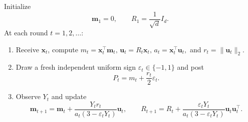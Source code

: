 \documentclass[11pt]{article}
\newcommand{\norm}[1]{\lVert #1\rVert_2}
\newcommand{\bm}{\boldsymbol m}
\newcommand{\bx}{\boldsymbol x}
\begin{document}
\begin{algorithm}[H]
\caption{Adversarial Contextual Search}\label{alg:adversarial}
\vspace{3pt}
Initialize
\begin{equation}\label{eq:init}
 \bm_1=0,\qquad R_1=\frac1{\sqrt d}I_d.
\end{equation}
At each round $t=1,2,\ldots$:
\begin{enumerate}
 \item Receive $\bx_t$, compute
 \(
 m_t=\bx_t^\top\bm_t,\,
 \boldsymbol u_t=R_t\bx_t,\,
 a_t=\bx_t^\top\boldsymbol u_t,\) and \(
 r_t=\norm{\boldsymbol u_t}.
 \)
 \item Draw a fresh independent uniform {sign }$\varepsilon_t\in\{-1,1\}$ and post
 \begin{equation}\label{eq:price}
 P_t=m_t+\frac{r_t}{2}\varepsilon_t.
 \end{equation}
 \item Observe $Y_t$ and update
 \begin{equation}\label{eq:update}
 \bm_{t+1}=\bm_t+\frac{Y_t r_t}{a_t(3-\varepsilon_t Y_t)}\boldsymbol u_t,
 \qquad
 R_{t+1}=R_t+\frac{\varepsilon_t Y_t}{a_t(3-\varepsilon_t Y_t)}\boldsymbol u_t\boldsymbol u_t^\top.
 \end{equation}
\end{enumerate}
\end{algorithm}
\end{document}
